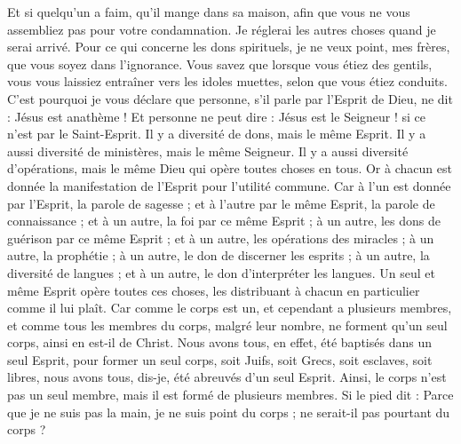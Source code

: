 \begin{multicols}{2}
Et si quelqu'un a faim, qu'il mange dans sa maison, afin que vous ne vous assembliez pas pour votre condamnation. Je réglerai les autres choses quand je serai arrivé.
\VerseOne{}Pour ce qui concerne les dons spirituels, je ne veux point, mes frères, que vous soyez dans l’ignorance.
Vous savez que lorsque vous étiez des gentils, vous vous laissiez entraîner vers les idoles muettes, selon que vous étiez conduits.
C'est pourquoi je vous déclare que personne, s’il parle par l'Esprit de Dieu, ne dit : Jésus est anathème ! Et personne ne peut dire : Jésus est le Seigneur ! si ce n’est par le Saint-Esprit.
Il y a diversité de dons, mais le même Esprit.
Il y a aussi diversité de ministères, mais le même Seigneur.
Il y a aussi diversité d'opérations, mais le même Dieu qui opère toutes choses en tous.
Or à chacun est donnée la manifestation de l'Esprit pour l'utilité commune.
Car à l'un est donnée par l'Esprit, la parole de sagesse ; et à l'autre par le même Esprit, la parole de connaissance ;
et à un autre, la foi par ce même Esprit ; à un autre, les dons de guérison par ce même Esprit ;
et à un autre, les opérations des miracles ; à un autre, la prophétie ; à un autre, le don de discerner les esprits ; à un autre, la diversité de langues ; et à un autre, le don d'interpréter les langues.
Un seul et même Esprit opère toutes ces choses, les distribuant à chacun en particulier comme il lui plaît.
Car comme le corps est un, et cependant a plusieurs membres, et comme tous les membres du corps, malgré leur nombre, ne forment qu’un seul corps, ainsi en est-il de Christ.
Nous avons tous, en effet, été baptisés dans un seul Esprit, pour former un seul corps, soit Juifs, soit Grecs, soit esclaves, soit libres, nous avons tous, dis-je, été abreuvés d'un seul Esprit.
Ainsi, le corps n’est pas un seul membre, mais il est formé de plusieurs membres.
Si le pied dit : Parce que je ne suis pas la main, je ne suis point du corps ; ne serait-il pas pourtant du corps ?

\end{multicols}
